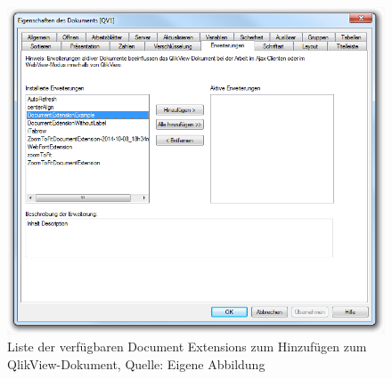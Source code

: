 \begin{appendix}
\begin{figure}[htbp]
	\centering
		\includegraphics[width=1.00\textwidth]{./img/DocumentExtensionListe/DocumentExtensionListe.png}
	\caption[Liste der verfügbaren Document Extensions]{Liste der verfügbaren Document Extensions zum Hinzufügen zum QlikView-Dokument, Quelle: Eigene Abbildung}
	\label{fig:DocumentExtensionListe}
\end{figure}





\end{appendix}
